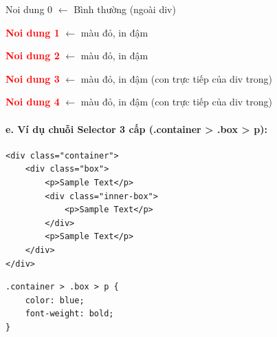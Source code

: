 \begin{browserWindow}
\sffamily\small
\textcolor{darkText}{Noi dung 0} {\small\textcolor{gray!60}{$\leftarrow$ Bình thường (ngoài div)}} \par\vspace{4pt}
\begin{tcolorbox}[arc=2pt, colback=primaryBlue!5, colframe=primaryBlue!40, boxrule=1pt, title={\sffamily\small\color{white}\textbf{div ngoài}}, colbacktitle=primaryBlue!70]
\textcolor{red}{\textbf{Noi dung 1}} {\small\textcolor{gray!60}{$\leftarrow$ màu đỏ, in đậm}} \par\vspace{2pt}
\textcolor{red}{\textbf{Noi dung 2}} {\small\textcolor{gray!60}{$\leftarrow$ màu đỏ, in đậm}} \par\vspace{3pt}
\begin{tcolorbox}[arc=2pt, colback=white, colframe=accentOrange!50, boxrule=1pt, title={\sffamily\scriptsize\color{white}\textbf{div trong}}, colbacktitle=accentOrange!80]
\textcolor{red}{\textbf{Noi dung 3}} {\small\textcolor{gray!60}{$\leftarrow$ màu đỏ, in đậm (con trực tiếp của div trong)}} \par\vspace{2pt}
\textcolor{red}{\textbf{Noi dung 4}} {\small\textcolor{gray!60}{$\leftarrow$ màu đỏ, in đậm (con trực tiếp của div trong)}}
\end{tcolorbox}\vspace{3pt}
\end{tcolorbox}
\end{browserWindow}

\paragraph{e. Ví dụ chuỗi Selector 3 cấp (.container > .box > p):}

\begin{codeWindow}
\begin{lstlisting}[language=HTML5]
<div class="container">
    <div class="box">
        <p>Sample Text</p>
        <div class="inner-box">
            <p>Sample Text</p>
        </div>
        <p>Sample Text</p>
    </div>
</div>
\end{lstlisting}

\begin{lstlisting}[language=CSS3]
.container > .box > p {
    color: blue;
    font-weight: bold;
}
\end{lstlisting}
\end{codeWindow}

